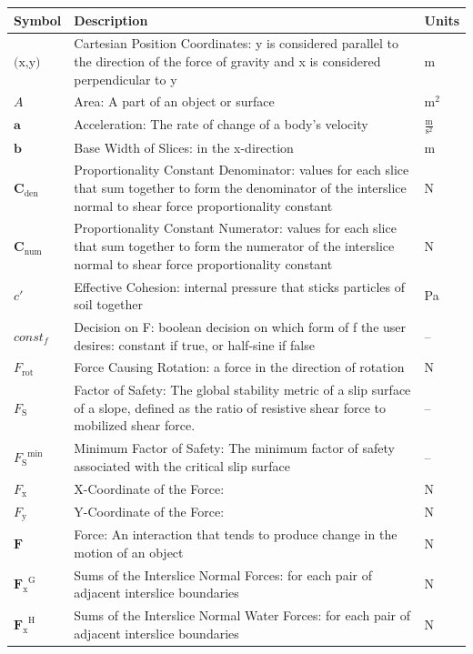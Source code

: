 \documentclass[12pt]{article}
\begin{document}
\begin{longtabu}{l X[l] l}
\toprule
\textbf{Symbol} & \textbf{Description} & \textbf{Units}
\\
\midrule
\endhead
$\text{(x,y)}$ & Cartesian Position Coordinates: y is considered parallel to the direction of the force of gravity and x is considered perpendicular to y & m
\\
$A$ & Area: A part of an object or surface & $\text{m}^{2}$
\\
$\mathbf{a}$ & Acceleration: The rate of change of a body's velocity & $\frac{\text{m}}{\text{s}^{2}}$
\\
$\mathbf{b}$ & Base Width of Slices: in the x-direction & m
\\
${\mathbf{C}_{\text{den}}}$ & Proportionality Constant Denominator: values for each slice that sum together to form the denominator of the interslice normal to shear force proportionality constant & N
\\
${\mathbf{C}_{\text{num}}}$ & Proportionality Constant Numerator: values for each slice that sum together to form the numerator of the interslice normal to shear force proportionality constant & N
\\
$c'$ & Effective Cohesion: internal pressure that sticks particles of soil together & Pa
\\
$const_f$ & Decision on F: boolean decision on which form of f the user desires: constant if true, or half-sine if false & --
\\
${F_{\text{rot}}}$ & Force Causing Rotation: a force in the direction of rotation & N
\\
${F_{\text{S}}}$ & Factor of Safety: The global stability metric of a slip surface of a slope, defined as the ratio of resistive shear force to mobilized shear force. & --
\\
${{F_{\text{S}}}^{\text{min}}}$ & Minimum Factor of Safety: The minimum factor of safety associated with the critical slip surface & --
\\
${F_{\text{x}}}$ & X-Coordinate of the Force:  & N
\\
${F_{\text{y}}}$ & Y-Coordinate of the Force:  & N
\\
$\mathbf{F}$ & Force: An interaction that tends to produce change in the motion of an object & N
\\
${{\mathbf{F}_{\text{x}}}^{\text{G}}}$ & Sums of the Interslice Normal Forces: for each pair of adjacent interslice boundaries & N
\\
${{\mathbf{F}_{\text{x}}}^{\text{H}}}$ & Sums of the Interslice Normal Water Forces: for each pair of adjacent interslice boundaries & N

\end{longtabu}
\end{document}

